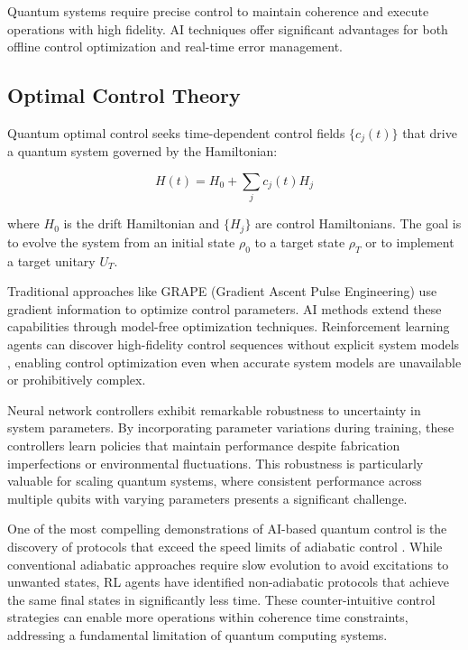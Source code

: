 Quantum systems require precise control to maintain coherence and execute operations with high fidelity. AI techniques offer significant advantages for both offline control optimization and real-time error management.

\subsection{Optimal Control Theory}

Quantum optimal control seeks time-dependent control fields $\{c_j(t)\}$ that drive a quantum system governed by the Hamiltonian:

\begin{equation}
H(t) = H_0 + \sum_j c_j(t) H_j
\end{equation}

where $H_0$ is the drift Hamiltonian and $\{H_j\}$ are control Hamiltonians. The goal is to evolve the system from an initial state $\rho_0$ to a target state $\rho_T$ or to implement a target unitary $U_T$.

Traditional approaches like GRAPE (Gradient Ascent Pulse Engineering) use gradient information to optimize control parameters. AI methods extend these capabilities through model-free optimization techniques. Reinforcement learning agents can discover high-fidelity control sequences without explicit system models \cite{bukov2018reinforcement}, enabling control optimization even when accurate system models are unavailable or prohibitively complex.

Neural network controllers exhibit remarkable robustness to uncertainty in system parameters. By incorporating parameter variations during training, these controllers learn policies that maintain performance despite fabrication imperfections or environmental fluctuations. This robustness is particularly valuable for scaling quantum systems, where consistent performance across multiple qubits with varying parameters presents a significant challenge.

One of the most compelling demonstrations of AI-based quantum control is the discovery of protocols that exceed the speed limits of adiabatic control \cite{ding2021breaking}. While conventional adiabatic approaches require slow evolution to avoid excitations to unwanted states, RL agents have identified non-adiabatic protocols that achieve the same final states in significantly less time. These counter-intuitive control strategies can enable more operations within coherence time constraints, addressing a fundamental limitation of quantum computing systems.

